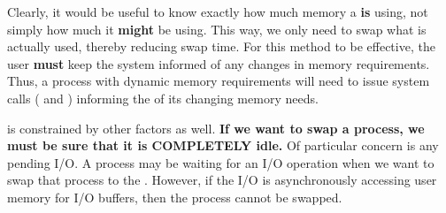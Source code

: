 Clearly, it would be useful to know exactly how much memory a   \textbf{is} using, not simply how much it \textbf{might} be using.
This way, we only need to swap what is actually used, thereby reducing swap time.
For this method to be effective, the user \textbf{must} keep the system informed of any changes in memory requirements.
Thus, a process with dynamic memory requirements will need to issue system calls ( and ) informing the  of its changing memory needs.

 is constrained by other factors as well.
\textbf{If we want to swap a process, we must be sure that it is COMPLETELY idle.}
Of particular concern is any pending I/O.
A process may be waiting for an I/O operation when we want to swap that process to the .
However, if the I/O is asynchronously accessing user memory for I/O buffers, then the process cannot be swapped.


